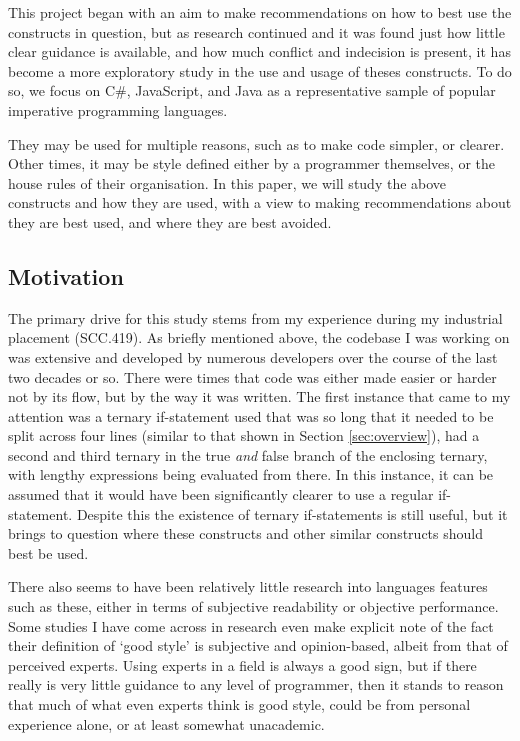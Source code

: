 \documentclass{article}
\begin{document}
        This project began with an aim to make recommendations on how to best use the constructs in question, but as research continued and it was found just how little clear guidance is available, and how much conflict and indecision is present, it has become a more exploratory study in the use and usage of theses constructs. To do so, we focus on C\#, JavaScript, and Java as a representative sample of popular imperative programming languages.

        They may be used for multiple reasons, such as to make code simpler, or clearer. Other times, it may be style defined either by a programmer themselves, or the house rules of their organisation.  In this paper, we will study the above constructs and how they are used, with a view to making recommendations about they are best used, and where they are best avoided.
    \subsection{Motivation}
        The primary drive for this study stems from my experience during my industrial placement (SCC.419). As briefly mentioned above, the codebase I was working on was extensive and developed by numerous developers over the course of the last two decades or so. There were times that code was either made easier or harder not by its flow, but by the way it was written. The first instance that came to my attention was a ternary if-statement used that was so long that it needed to be split across four lines (similar to that shown in Section \ref{sec:overview}), had a second and third ternary in the true \emph{and} false branch of the enclosing ternary, with lengthy expressions being evaluated from there. In this instance, it can be assumed that it would have been significantly clearer to use a regular if-statement. Despite this the existence of ternary if-statements is still useful, but it brings to question where these constructs and other similar constructs should best be used.

        There also seems to have been relatively little research into languages features such as these, either in terms of subjective readability or objective performance. Some studies I have come across in research even make explicit note of the fact their definition of `good style' is subjective and opinion-based, albeit from that of perceived experts. Using experts in a field is always a good sign, but if there really is very little guidance to any level of programmer, then it stands to reason that much of what even experts think is good style, could be from personal experience alone, or at least somewhat unacademic.
        
\end{document}
